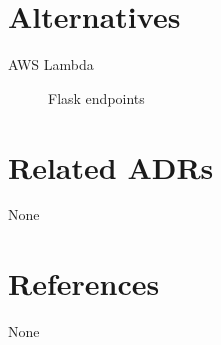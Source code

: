\documentclass{article}
\begin{document}
\section{Alternatives}
\begin{description}
    \item[AWS Lambda] Flask endpoints
\end{description}


\section{Related ADRs}
None

\section{References}
None
\end{document}
